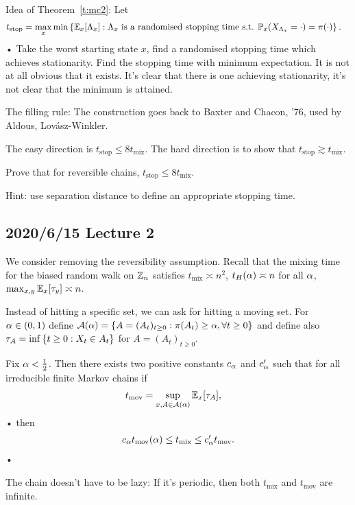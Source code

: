 Idea of Theorem~\ref{t:mc2}: Let 
\begin{align*}
t_{\text{stop}} &= \max_x\min \left\{{\mathbb{E}_x[\Lambda_x]}:{\Lambda_x \text{ is a randomised stopping time s.t. }\mathbb{P}_x(X_{\Lambda_x}=\cdot)=\pi(\cdot)}\right\}.
\end{align*}•
Take the worst starting state $x$, find a randomised stopping time which achieves stationarity. Find the stopping time with minimum expectation. It is not at all obvious that it exists. It's clear that there is one achieving stationarity, it's not clear that the minimum is attained.

The filling rule: The construction goes back to Baxter and Chacon, '76, used by Aldous, Lov\'asz-Winkler. 

The easy direction is $t_{\text{stop}}\le 8t_{\text{mix}}$. The hard direction is to show that $t_{\text{stop}}\gtrsim t_{\text{mix}}$. 
\begin{exr}
Prove that for reversible chains, $t_{\text{stop}}\le 8t_{\text{mix}}$. 

Hint: use separation distance to define an appropriate stopping time.
\end{exr}


\subsection*{2020/6/15 Lecture 2}

We consider removing the reversibility assumption. Recall that the mixing time for the biased random walk on $\mathbb{Z}_n$ satisfies $t_{\text{mix}}\asymp n^2$, $t_H(\alpha)\asymp n$ for all $\alpha$, $\max_{x,y} \mathbb{E}_x[\tau_y]\asymp n$.

Instead of hitting a specific set, we can ask for hitting a moving set.
For $\alpha\in (0,1)$ define $\mathcal{A}(\alpha) = \left\{{A=(A_t)_{t\ge 0}}:{\pi(A_t)\ge \alpha, \forall t\ge 0}\right\}$ and define also $\tau_A = \inf\left\{{t\ge 0}:{X_t\in A_t}\right\}$ for $A=(A_t)_{t\ge 0}$.

\begin{thm}[Winkler-S]
Fix $\alpha<\frac{1}{2}$. Then there exists two positive constants $c_\alpha$ and $c_\alpha'$ such that for all irreducible finite Markov chains if
\begin{align*}
t_{\text{mov}}&= \sup_{x,A\in \mathcal{A}(\alpha)} \mathbb{E}_x[\tau_A],
\end{align*}•
then 
\begin{align*}
c_\alpha t_{\text{mov}}(\alpha)\le t_{\text{mix}} \le c_\alpha't_{\text{mov}}.
\end{align*}•
\end{thm}
The chain doesn't have to be lazy: If it's periodic, then both $t_{\text{mix}}$ and $t_{\text{mov}}$ are infinite.


